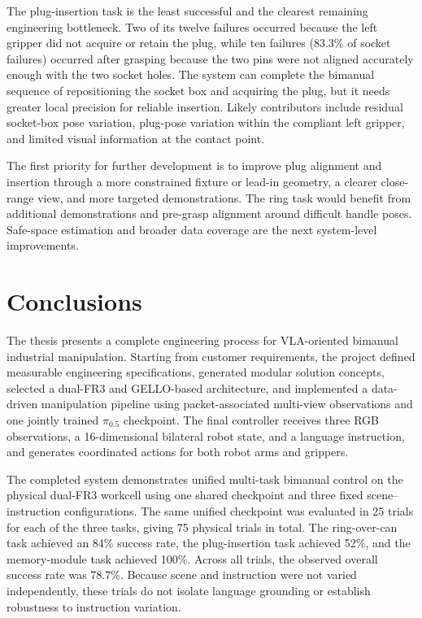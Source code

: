 The plug-insertion task is the least successful and the clearest remaining engineering bottleneck. Two of its twelve failures occurred because the left gripper did not acquire or retain the plug, while ten failures (83.3\% of socket failures) occurred after grasping because the two pins were not aligned accurately enough with the two socket holes. The system can complete the bimanual sequence of repositioning the socket box and acquiring the plug, but it needs greater local precision for reliable insertion. Likely contributors include residual socket-box pose variation, plug-pose variation within the compliant left gripper, and limited visual information at the contact point.

The first priority for further development is to improve plug alignment and insertion through a more constrained fixture or lead-in geometry, a clearer close-range view, and more targeted demonstrations. The ring task would benefit from additional demonstrations and pre-grasp alignment around difficult handle poses. Safe-space estimation and broader data coverage are the next system-level improvements.


\section{Conclusions}

The thesis presents a complete engineering process for VLA-oriented bimanual industrial manipulation. Starting from customer requirements, the project defined measurable engineering specifications, generated modular solution concepts, selected a dual-FR3 and GELLO-based architecture, and implemented a data-driven manipulation pipeline using packet-associated multi-view observations and one jointly trained $\pi_{0.5}$ checkpoint. The final controller receives three RGB observations, a 16-dimensional bilateral robot state, and a language instruction, and generates coordinated actions for both robot arms and grippers.

The completed system demonstrates unified multi-task bimanual control on the physical dual-FR3 workcell using one shared checkpoint and three fixed scene--instruction configurations. The same unified checkpoint was evaluated in 25 trials for each of the three tasks, giving 75 physical trials in total. The ring-over-can task achieved an 84\% success rate, the plug-insertion task achieved 52\%, and the memory-module task achieved 100\%. Across all trials, the observed overall success rate was 78.7\%. Because scene and instruction were not varied independently, these trials do not isolate language grounding or establish robustness to instruction variation.

